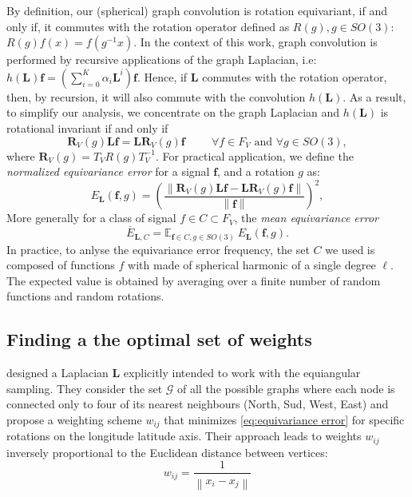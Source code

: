 \documentclass{article} %
\newcommand{\norm}[1]{\left\lVert#1\right\rVert}
\renewcommand{\b}[1]{{\bm{#1}}}   %
\newcommand{\nati}[1]{{\color[rgb]{.3,.5,.9}{#1}}}
\begin{document}
By definition, our (spherical) graph convolution is rotation equivariant, if and only if, it commutes with the rotation operator defined as $R(g), g\in SO(3)$: $R(g) f(x) = f\left(g^{-1} x \right)$. 
In the context of this work, graph convolution is performed by recursive applications of the graph Laplacian, i.e: $h(\b{L}) \b{f} = \left(\sum_{i=0}^K \alpha_i \b{L}^i\right) \b{f}$\nati{Put this equation somewhere else?}.  Hence, if $\b{L}$ commutes with the rotation operator, then, by recursion, it will also commute with the convolution $h(\b{L})$.
As a result, to simplify our analysis, we concentrate on the graph Laplacian and $h(\b{L})$ is rotational invariant if and only if
\begin{equation} \label{eq:equivariance}
	\b{R}_V(g) \b{L} \b{f} = \b{L} \b{R}_V(g) \b{f} \hspace{1cm} \forall f\in F_V \text{ and } \forall g\in SO(3),
\end{equation}
where $\b{R}_V(g) = T_V R(g) T_V^{-1}$. For practical application, we define the \textit{normalized equivariance error} for a signal $\b{f}$, and a  rotation $g$ as:
\begin{equation} \label{eq:equivariance error}
	E_{\b{L}}(\b{f}, g) = \left(\frac{ \norm {\b{R}_V(g) \b{L} \b{f} - \b{L} \b{R}_V(g) \b{f}} }{\norm {\b{f}}}\right)^2,
\end{equation}
More generally for a class of signal $f \in C \subset F_V$, the \textit{mean equivariance error}
\begin{equation} \label{eq:mean equivariance error}
	\overline E_{\b{L}, C} = \mathbb E_{\b{f}\in C, g\in SO(3)} \ E_{\b{L}}(\b{f}, g).
\end{equation}
In practice, to anlyse the equivariance error frequency,  the set $C$ we used is composed of functions $f$ with made of spherical harmonic of a single degree $\ell$.
The expected value is obtained by averaging over a finite number of random functions and random rotations.

\subsection{Finding a the optimal set of weights}
\cite{khasanova2017sphericalcnn} designed a Laplacian $\b{L}$ explicitly intended to work with the equiangular sampling.
They consider the set $\mathcal{G}$ of all the possible graphs where each node is connected only to four of its nearest neighbours (North, Sud, West, East) and propose a weighting scheme $w_{ij}$ that minimizes \eqref{eq:equivariance error} for specific rotations on the longitude latitude axis.
Their approach leads to weights $w_{ij}$ inversely proportional to the Euclidean distance between vertices:
\begin{equation} \label{eq:frossard weights}
	w_{ij} = \frac{1}{\norm{x_i-x_j}}
\end{equation}
\end{document}
